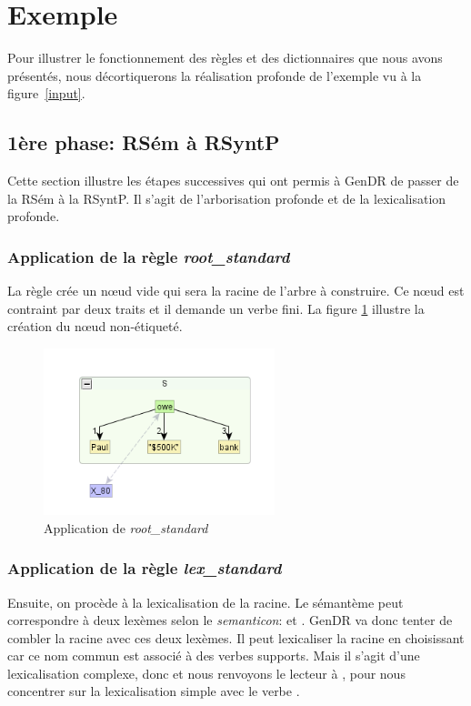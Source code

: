 
\section{Exemple}\label{secexemple}

Pour illustrer le fonctionnement des règles et des dictionnaires que nous avons présentés, nous décortiquerons la réalisation profonde de l'exemple vu à la figure~\ref{input}.

\subsection{1ère phase: RSém à RSyntP}
Cette section illustre les étapes successives qui ont permis à GenDR de passer de la \ac{RSém} à la \ac{RSyntP}. Il s'agit de l'arborisation profonde et de la lexicalisation profonde.

\subsubsection{Application de la règle \emph{root\_standard}}
La règle crée un n\oe{}ud vide qui sera la racine de l'arbre à construire. Ce n\oe{}ud est contraint par deux traits et il demande un verbe fini. La figure \ref{fig:rootstand} illustre la création du n\oe{}ud non-étiqueté.
\begin{figure}[htb]
	\centering
	\includegraphics[width=0.6\textwidth, trim = {0cm 0cm 0cm 0cm},clip]{ch3/figs/inspecteur_root.png}
	\vspace{-0.5cm}
	\caption{Application de \emph{root\_standard}}
	\label{fig:rootstand}
\end{figure}

\subsubsection{Application de la règle \emph{lex\_standard}}
Ensuite, on procède à la lexicalisation de la racine. Le sémantème  peut correspondre à deux lexèmes selon le \emph{semanticon}:  et . GenDR va donc tenter de combler la racine avec ces deux lexèmes. Il peut lexicaliser la racine en choisissant  car ce nom commun est associé à des verbes supports. Mais il s'agit d'une lexicalisation complexe, donc et nous renvoyons le lecteur à \cite{lambrey15,LambreyImplementationcollocationspour2017,lareau18}, pour nous concentrer sur la lexicalisation simple avec le verbe .

